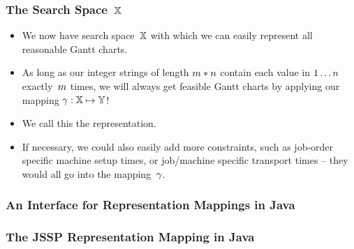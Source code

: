 \documentclass[mathserif]{beamer}%
\begin{document}
\begin{frame}%
\frametitle{The Search Space~$\mathbb{X}$}%
\begin{itemize}%
\item We now have search space~$\mathbb{X}$ with which we can easily represent all reasonable Gantt charts.%
\item<2-> As long as our integer strings of length $m*n$ contain each value in $1\ldots n$ exactly~$m$ times, we will always get \alert{feasible} Gantt charts by applying our mapping $\gamma:\mathbb{X}\mapsto\mathbb{Y}$!%
\item<3-> We call this the \alert{representation}.%
\item<4-> If necessary, we could also easily add more constraints, such as job-order specific machine setup times, or job/machine specific transport times -- they would all go into the mapping~$\gamma$.%
\end{itemize}%
\end{frame}%
%
\begin{frame}[containsverbatim]%
\frametitle{An Interface for Representation Mappings in Java}%
%
\end{frame}%
%
\begin{frame}[containsverbatim]%
\frametitle{The JSSP Representation Mapping in Java}%
%
\end{frame}%
%
\end{document}
